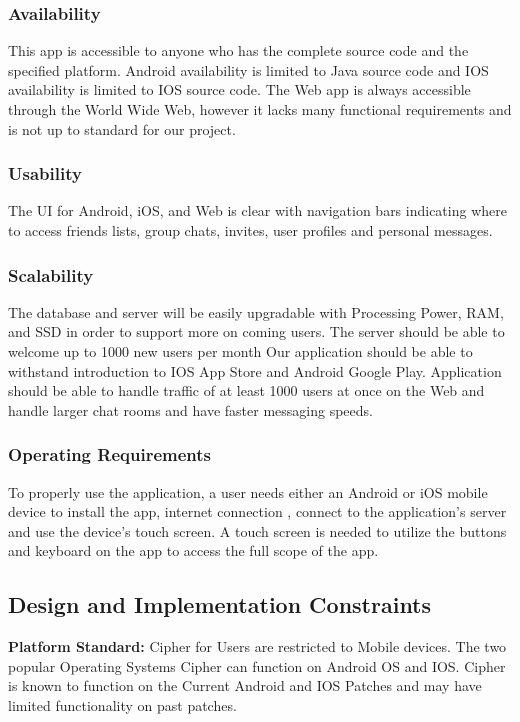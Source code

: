 \documentclass[12pt]{article}
\begin{document}
\subsubsection{Availability}
This app is accessible to anyone who has the complete source code and the specified platform. Android availability is limited to Java source code and IOS availability is limited to IOS source code. The Web app is always accessible through the World Wide Web, however it lacks many functional requirements and is not up to standard for our project.				

\subsubsection{Usability}
The UI for Android, iOS, and Web is clear with navigation bars indicating where to access friends lists, group chats, invites, user profiles and personal messages. 

\subsubsection{Scalability}
 The database and server will be easily upgradable with Processing Power, RAM, and SSD in order to support more on coming users. The server should be able to welcome up to 1000 new users per month
 Our application should be able to withstand introduction to IOS App Store and Android Google Play. Application should be able to handle traffic of at least 1000 users at once on the Web and handle larger chat rooms and have faster messaging speeds.

\subsubsection{Operating Requirements}
To properly use the application, a user needs either an Android or iOS mobile device to install the app, internet connection   , connect to the application's server and use the device’s touch screen. A touch screen is needed to utilize the buttons and keyboard on the app to access the full scope of the app. 


\subsection{Design and Implementation Constraints}

\textbf{Platform Standard:}
	Cipher for Users are restricted to Mobile devices. The two popular Operating Systems Cipher can function on Android OS and IOS. Cipher is known to function on the Current Android and IOS Patches and may have limited functionality on past patches. 
\end{document}
